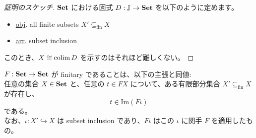 \documentclass[
		head_space=20mm,
		foot_space=20mm,
		gutter=10mm,
		line_length=190mm
]{jlreq}
\begin{document}
\begin{proof}[証明のスケッチ]
	$\mathbf{Set}$ における図式 $D:\mathbb{J}\to\mathbf{Set}$ を以下のように定めます。
	\begin{itemize}
		\item \underline{obj}. all finite subsets $X'\subseteq_{\mathrm{fin}}X$ 
		\item \underline{arr}. subset inclusion
	\end{itemize}
	このとき、$X\cong\operatorname*{colim} D$ を示すのはそれほど難しくない。
\end{proof}

\begin{proposition}
	$F:\mathbf{Set}\to\mathbf{Set}$ が finitary であることは、以下の主張と同値: \\ 
	任意の集合 $X\in\mathbf{Set}$ と、任意の $t\in FX$ について、ある有限部分集合 $X'\subseteq_{\mathrm{fin}}X$ が存在し、
	\[t\in \mathrm{Im}(F\iota)\] である。\vspace{3pt}\\
	なお、$\iota:X'\hookrightarrow X$ は subset inclusion であり、$F\iota$ はこの $\iota$ に関手 $F$ を適用したもの。\vspace{6pt}
	\begin{prooftree}
	\end{prooftree}
\end{proposition}
\end{document}
